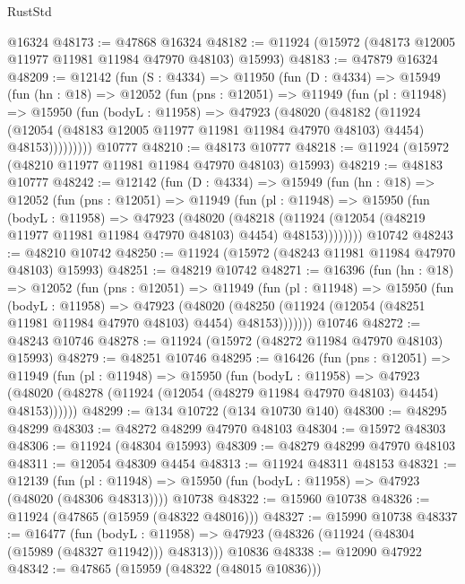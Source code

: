 \begin{lexlean}{RustStd}
\begin{coremodule}
    @16324
@48173 := @47868 @16324
@48182 := @11924 (@15972 (@48173 @12005 @11977 @11981 @11984 @47970 @48103) @15993)
@48183 := @47879 @16324
@48209 := @12142
    (fun (S : @4334) =>
    @11950
      (fun (D : @4334) =>
      @15949
        (fun (hn : @18) =>
        @12052
          (fun (pns : @12051) =>
          @11949
            (fun (pl : @11948) =>
            @15950
              (fun (bodyL : @11958) =>
              @47923
                (@48020
                  (@48182
                    (@11924
                      (@12054 (@48183 @12005 @11977 @11981 @11984 @47970 @48103) @4454)
                      @48153)))))))))
    @10777
@48210 := @48173 @10777
@48218 := @11924 (@15972 (@48210 @11977 @11981 @11984 @47970 @48103) @15993)
@48219 := @48183 @10777
@48242 := @12142
    (fun (D : @4334) =>
    @15949
      (fun (hn : @18) =>
      @12052
        (fun (pns : @12051) =>
        @11949
          (fun (pl : @11948) =>
          @15950
            (fun (bodyL : @11958) =>
            @47923
              (@48020
                (@48218
                  (@11924 (@12054 (@48219 @11977 @11981 @11984 @47970 @48103) @4454) @48153))))))))
    @10742
@48243 := @48210 @10742
@48250 := @11924 (@15972 (@48243 @11981 @11984 @47970 @48103) @15993)
@48251 := @48219 @10742
@48271 := @16396
    (fun (hn : @18) =>
    @12052
      (fun (pns : @12051) =>
      @11949
        (fun (pl : @11948) =>
        @15950
          (fun (bodyL : @11958) =>
          @47923
            (@48020
              (@48250 (@11924 (@12054 (@48251 @11981 @11984 @47970 @48103) @4454) @48153)))))))
    @10746
@48272 := @48243 @10746
@48278 := @11924 (@15972 (@48272 @11984 @47970 @48103) @15993)
@48279 := @48251 @10746
@48295 := @16426
    (fun (pns : @12051) =>
    @11949
      (fun (pl : @11948) =>
      @15950
        (fun (bodyL : @11958) =>
        @47923 (@48020 (@48278 (@11924 (@12054 (@48279 @11984 @47970 @48103) @4454) @48153))))))
@48299 := @134 @10722 (@134 @10730 @140)
@48300 := @48295 @48299
@48303 := @48272 @48299 @47970 @48103
@48304 := @15972 @48303
@48306 := @11924 (@48304 @15993)
@48309 := @48279 @48299 @47970 @48103
@48311 := @12054 @48309 @4454
@48313 := @11924 @48311 @48153
@48321 := @12139
    (fun (pl : @11948) => @15950 (fun (bodyL : @11958) => @47923 (@48020 (@48306 @48313))))
    @10738
@48322 := @15960 @10738
@48326 := @11924 (@47865 (@15959 (@48322 @48016)))
@48327 := @15990 @10738
@48337 := @16477
    (fun (bodyL : @11958) => @47923 (@48326 (@11924 (@48304 (@15989 (@48327 @11942))) @48313)))
    @10836
@48338 := @12090 @47922
@48342 := @47865 (@15959 (@48322 (@48015 @10836)))

\end{coremodule}
\end{lexlean}
